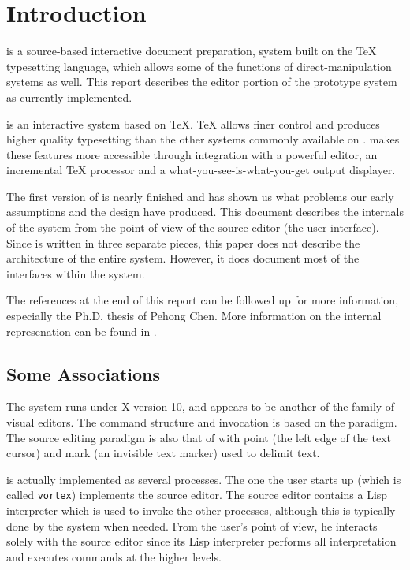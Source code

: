 \section{Introduction}

{\VorTeX}\cite{phc:vortex} is a source-based interactive document
preparation, system built on the {\TeX} typesetting
language\cite{knuth:tex}, which allows some of the functions of
direct-manipulation systems as well.  This report describes the editor
portion of the prototype system as currently implemented.

{\VorTeX} is an interactive system based on {\TeX}. {\TeX} allows
finer control and produces higher quality typesetting than the other
systems commonly available on {\UNIX}.  {\VorTeX} makes these features
more accessible through integration with a powerful editor, an
incremental {\TeX} processor and a what-you-see-is-what-you-get output
displayer.

The first version of {\VorTeX} is nearly finished and has
shown us what problems our early assumptions and the design have
produced.  This document describes the internals of the system from
the point of view of the {\VorTeX} source editor (the user interface).
Since {\VorTeX} is written in three separate pieces, this paper does
not describe the architecture of the entire system.  However, it
does document most of the interfaces within the system.

The references at the end of this report can be followed up for more
information, especially the Ph.D. thesis of Pehong Chen\cite{phc:phd}.
More information on the internal represenation can be found
in \cite{phc:int}.

\subsection{Some Associations}

The system runs under X version 10, and appears to be another of the
{\EMACS}\cite{stallman:emacs} family of visual editors.  The command
structure and invocation is based on the {\EMACS} paradigm.  The
source editing paradigm is also that of {\EMACS} with point (the left
edge of the text cursor) and mark (an invisible text marker) used to
delimit text.

{\VorTeX} is actually implemented as several processes.  The one the
user starts up (which is called {\tt vortex}) implements the source
editor.  The source editor contains a Lisp interpreter which is used
to invoke the other processes, although this is typically done by the
system when needed.  From the user's point of view, he interacts
solely with the source editor since its Lisp interpreter performs all
interpretation and executes commands at the higher levels.

